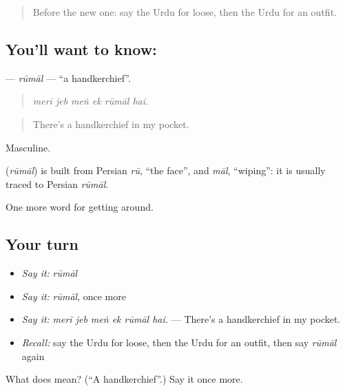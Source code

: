 \begin{quote}
Before the new one: say the Urdu for loose, then the Urdu for an outfit.
\end{quote}

\subsection*{You'll want to know: }
\textbf{} — \emph{rūmāl} — \textquotedblleft{}a handkerchief\textquotedblright{}.

\begin{quote}
     
\end{quote}

\begin{quote}
\emph{merī jeb meṅ ek rūmāl hai.}
\end{quote}

\begin{quote}
There's a handkerchief in my pocket.
\end{quote}

Masculine.

\begin{cousinweb}
\textbf{} (\emph{rūmāl}) is built from Persian \emph{rū}, \textquotedblleft{}the face\textquotedblright{}, and \emph{māl}, \textquotedblleft{}wiping\textquotedblright{}: it is usually traced to Persian \emph{rūmāl}.
\end{cousinweb}

\begin{grammarlens}[title={What you've built}]
One more word for getting around.
\end{grammarlens}

\subsection*{Your turn}
\begin{itemize}
\raggedright
  \item \emph{Say it:} \emph{rūmāl}
  \item \emph{Say it:} \emph{rūmāl}, once more
  \item \emph{Say it:} \emph{merī jeb meṅ ek rūmāl hai.} — There's a handkerchief in my pocket.
  \item \emph{Recall:} say the Urdu for loose, then the Urdu for an outfit, then say \emph{rūmāl} again
\end{itemize}

\begin{tcolorbox}[breakable,colback=teal!4,colframe=teal!35!black,title={Before you move on}]
What does  mean? (\textquotedblleft{}A handkerchief\textquotedblright{}.) Say it once more.
\end{tcolorbox}
